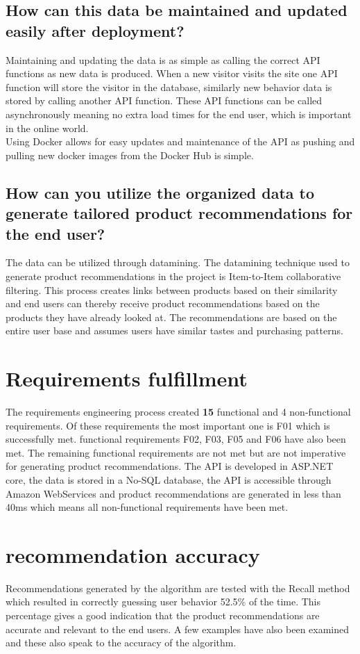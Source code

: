 \subsection{How can this data be maintained and updated easily after deployment?}
Maintaining and updating the data is as simple as calling the correct API functions as new data is produced. When a new visitor visits the site one API function will store the visitor in the database, similarly new behavior data is stored by calling another API function. These API functions can be called asynchronously meaning no extra load times for the end user, which is important in the online world. \\
Using Docker allows for easy updates and maintenance of the API as pushing and pulling new docker images from the Docker Hub is simple.

\subsection{How can you utilize the organized data to generate tailored product recommendations for the end user?}
The data can be utilized through datamining. The datamining technique used to generate product recommendations in the project is Item-to-Item collaborative filtering. This process creates links between products based on their similarity and end users can thereby receive product recommendations based on the products they have already looked at. The recommendations are based on the entire user base and assumes users have similar tastes and purchasing patterns.

\section{Requirements fulfillment}
The requirements engineering process created \textbf{15} functional and 4 non-functional requirements. Of these requirements the most important one is F01 which is successfully met. functional requirements F02, F03, F05 and F06 have also been met. The remaining functional requirements are not met but are not imperative for generating product recommendations. The API is developed in ASP.NET core, the data is stored in a No-SQL database, the API is accessible through Amazon WebServices and product recommendations are generated in less than 40ms which means all non-functional requirements have been met.

\section{recommendation accuracy}
Recommendations generated by the algorithm are tested with the Recall method which resulted in correctly guessing user behavior 52.5\% of the time. This percentage gives a good indication that the product recommendations are accurate and relevant to the end users. A few examples have also been examined and these also speak to the accuracy of the algorithm. 